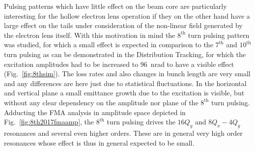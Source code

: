 \documentclass[%
 reprint,
 amsmath,amssymb,
 aps,
prstab,
]{revtex4-1}
\begin{document}
Pulsing patterns which have little effect on the beam core are particularly interesting for the hollow electron lens operation if they on the other hand have a large effect on the tails under consideration of the non-linear field generated by the electron lens itself. With this motivation in mind the $8^{\mathrm{th}}$ turn pulsing pattern was studied, for which a small effect is expected in comparison to the $7^{\mathrm{th}}$ and $10^{\mathrm{th}}$ turn pulsing as can be demonstrated in the Distribution Tracking, for which the excitation amplitudes had to be increased to 96~nrad to have a visible effect (Fig.~\ref{fig:8thsim}). The loss rates and also changes in bunch length are very small and any differences are here just due to statistical fluctuations. In the horizontal and vertical plane a small emittance growth due to the excitation is visible, but without any clear dependency on the amplitude nor plane of the $8^{\mathrm{th}}$ turn pulsing. Adducting the FMA analysis in amplitude space depicted in Fig.~\ref{fig:8th2017fmaamp}, the $8^{\mathrm{th}}$ turn pulsing drives the $16Q_y$ and \mbox{$8Q_x-4Q_y$} resonances and several even higher orders. These are in general very high order resonances whose effect is thus in general expected to be small.
\end{document}
